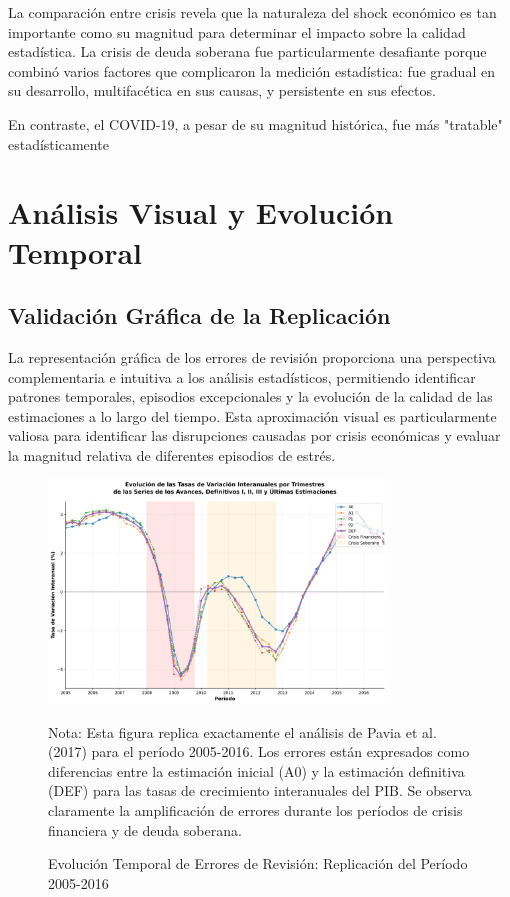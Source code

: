 \documentclass[12pt,a4paper]{article}
\begin{document}
La comparación entre crisis revela que la naturaleza del shock económico es tan importante como su magnitud para determinar el impacto sobre la calidad estadística. La crisis de deuda soberana fue particularmente desafiante porque combinó varios factores que complicaron la medición estadística: fue gradual en su desarrollo, multifacética en sus causas, y persistente en sus efectos.

En contraste, el COVID-19, a pesar de su magnitud histórica, fue más "tratable" estadísticamente
\section{Análisis Visual y Evolución Temporal}

\subsection{Validación Gráfica de la Replicación}

La representación gráfica de los errores de revisión proporciona una perspectiva complementaria e intuitiva a los análisis estadísticos, permitiendo identificar patrones temporales, episodios excepcionales y la evolución de la calidad de las estimaciones a lo largo del tiempo. Esta aproximación visual es particularmente valiosa para identificar las disrupciones causadas por crisis económicas y evaluar la magnitud relativa de diferentes episodios de estrés.

\begin{figure}[h]
\centering
\includegraphics[width=0.8\textwidth]{../figuras/figura_2_pavia_robusta_2005_2016.png}
\caption{Evolución Temporal de Errores de Revisión: Replicación del Período 2005-2016}
\label{fig:evolucion_2005_2016}
\begin{flushleft}
\footnotesize
Nota: Esta figura replica exactamente el análisis de Pavia et al. (2017) para el período 2005-2016. Los errores están expresados como diferencias entre la estimación inicial (A0) y la estimación definitiva (DEF) para las tasas de crecimiento interanuales del PIB. Se observa claramente la amplificación de errores durante los períodos de crisis financiera y de deuda soberana.
\end{flushleft}
\end{figure}
\end{document}
